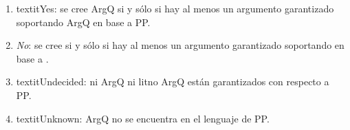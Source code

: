  \begin{enumerate}[(1)]
 
 \item textit{Yes}: se cree ArgQ si y sólo si hay al menos un argumento
 garantizado soportando ArgQ en base a PP.
 
 \item \textit{No}: se cree \lit{\no \ArgQ} si y sólo si hay al menos
 un argumento garantizado  soportando \lit{\no \ArgQ} en base a \PP.
 
 \item textit{Undecided}: ni ArgQ ni lit{no ArgQ} están garantizados
 con respecto a PP.
 
 \item textit{Unknown}: ArgQ no se encuentra en el lenguaje de PP.
 
 \end{enumerate}

